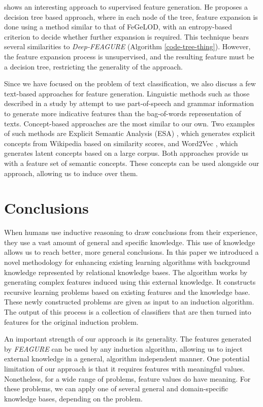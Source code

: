 \documentclass[twoside,11pt]{article}
\theoremstyle{definition}
\begin{document}
 shows an interesting approach to supervised feature generation. He proposes a decision tree based approach, where in each node of the tree, feature expansion is done using a method similar to that of FeGeLOD, with an entropy-based criterion to decide whether further expansion is required. This technique bears several similarities to \emph{Deep-FEAGURE} (Algorithm \ref{code-tree-thing}). However, the feature expansion process is unsupervised, and the resulting feature must be a decision tree, restricting the generality of the approach.

Since we have focused on the problem of text classification, we also discuss a few text-based approaches for feature generation. 
Linguistic methods such as those described in a study by  attempt to use part-of-speech and grammar information to generate more indicative features than the bag-of-words representation of texts.
Concept-based approaches are the most similar to our own. Two examples of such methods are Explicit Semantic Analysis (ESA) \cite{gabrilovich2009wikipediafull},  which generates explicit concepts from Wikipedia based on similarity scores, and Word2Vec , which generates latent concepts based on a large corpus. Both approaches provide us with a feature set of semantic concepts. These concepts can be used alongside our approach, allowing us to induce over them.

\section{Conclusions}

When humans use inductive reasoning to draw conclusions from their experience, they use a vast amount of general and specific knowledge. 
This use of knowledge allows us to reach better, more general conclusions.
In this paper we introduced a novel methodology for enhancing existing learning algorithms with background knowledge represented by relational knowledge bases.
The algorithm works by generating complex features induced using this external knowledge. It constructs recursive learning problems based on existing features and the knowledge base. These newly constructed problems are given as input to an induction algorithm. The output of this process is a collection of classifiers that are then turned into features for the original induction problem.

An important strength of our approach is its generality. The features generated by \emph{FEAGURE} can be used by any induction algorithm, allowing us to inject external knowledge in a general, algorithm independent manner.
One potential limitation of our approach is that it requires features with meaningful values. Nonetheless, for a wide range of problems, feature values do have meaning. For these problems, we can apply one of several general and domain-specific knowledge bases, depending on the problem.
\end{document}

